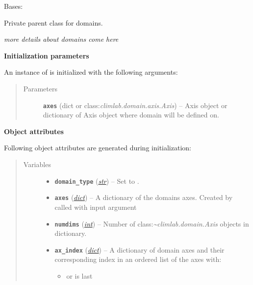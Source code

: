 \documentclass[letterpaper,10pt,english]{sphinxmanual}
\begin{document}
\begin{fulllineitems}
\label{api/climlab.domain:climlab.domain.domain._Domain}
Bases: \href{http://docs.python.org/2.7/library/functions.html\#object}{}

Private parent class for domains.

\emph{more details about domains come here}

\textbf{Initialization parameters}

An instance of  is initialized with the following 
arguments:
\begin{quote}\begin{description}
\item[{Parameters}] \leavevmode
\textbf{\texttt{axes}} (dict or class:\emph{climlab.domain.axis.Axis}) -- Axis object or dictionary of Axis object where domain will
be defined on.

\end{description}\end{quote}

\textbf{Object attributes}

Following object attributes are generated during initialization:
\begin{quote}\begin{description}
\item[{Variables}] \leavevmode\begin{itemize}
\item {} 
\textbf{\texttt{domain\_type}} (\href{http://docs.python.org/2.7/library/functions.html\#str}{\emph{str}}) -- Set to .

\item {} 
\textbf{\texttt{axes}} (\href{http://docs.python.org/2.7/library/stdtypes.html\#dict}{\emph{dict}}) -- A dictionary of the domains axes. Created by
{\hyperref[api/climlab.domain:climlab.domain.domain._Domain._make_axes_dict]{\emph{}}} called with input 
argument 

\item {} 
\textbf{\texttt{numdims}} (\href{http://docs.python.org/2.7/library/functions.html\#int}{\emph{int}}) -- Number of class:\emph{\textasciitilde{}climlab.domain.Axis} objects
in  dictionary.

\item {} 
\textbf{\texttt{ax\_index}} (\href{http://docs.python.org/2.7/library/stdtypes.html\#dict}{\emph{dict}}) -- 
A dictionary of domain axes and their corresponding index
in an ordered list of the axes with:
\begin{itemize}
\item {} 
 or  is last


\end{itemize}
\end{itemize}
\end{description}
\end{quote}
\end{fulllineitems}
\end{document}
